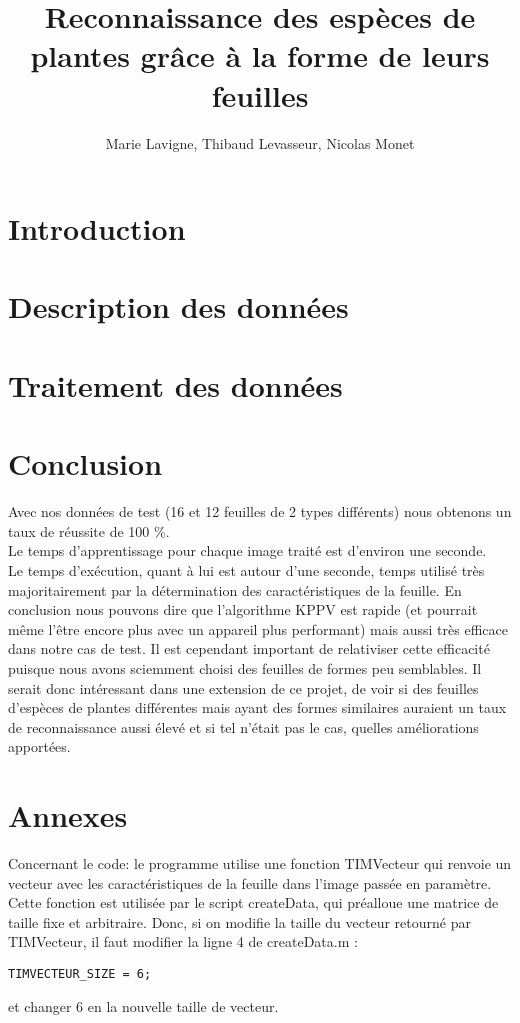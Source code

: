 \documentclass{article}
\title{Reconnaissance des espèces de plantes grâce à la forme de leurs feuilles}
\author{Marie Lavigne, Thibaud Levasseur, Nicolas Monet}
\begin{document}
\maketitle
\newpage
\tableofcontents
\newpage
\section{Introduction}

\newpage

\section{Description des données}

\section{Traitement des données}




\newpage
\section{Conclusion}
Avec nos données de test (16 et 12 feuilles de 2 types différents) nous obtenons un taux de réussite de 100 \%.\\
Le temps d'apprentissage pour chaque image traité est d'environ une seconde. \\
Le temps d'exécution, quant à lui est autour d'une seconde, temps utilisé très majoritairement par la détermination des caractéristiques de la feuille. 
En conclusion nous pouvons dire que l'algorithme KPPV est rapide (et pourrait même l'être encore plus avec un appareil plus performant) mais aussi très efficace dans notre cas de test.
Il est cependant important de relativiser cette efficacité puisque nous avons sciemment choisi des feuilles de formes peu semblables. Il serait donc intéressant dans une extension de ce projet, de voir si des feuilles d'espèces de plantes différentes mais ayant des formes similaires auraient un taux de reconnaissance aussi élevé et si tel n'était pas le cas, quelles améliorations apportées.
\newpage
\section{Annexes}
Concernant le code: le programme utilise une fonction TIMVecteur qui renvoie un vecteur avec les caractéristiques de la feuille dans l'image passée en paramètre. Cette fonction est utilisée par le script createData, qui préalloue une matrice de taille fixe et arbitraire.
\smallbreak
Donc, si on modifie la taille du vecteur retourné par TIMVecteur, il faut modifier la ligne 4 de createData.m :
\begin{verbatim}
TIMVECTEUR_SIZE = 6;
\end{verbatim}
et changer 6 en la nouvelle taille de vecteur.
\end{document}
